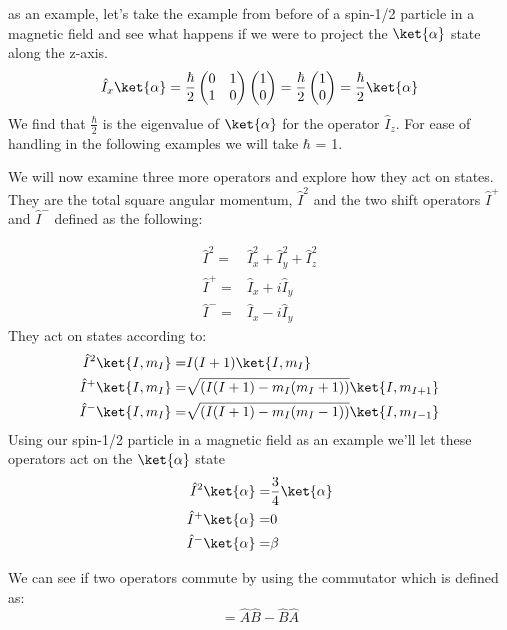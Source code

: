 as an example, let's take the example from before of a spin-1/2 particle in a magnetic field
and see what happens if we were to project the $\ket{\alpha}$ state along the z-axis.
\begin{equation}\label{eqn:operators}
  \hat{I}_x\ket{\alpha} = \frac{\hbar}{2}\begin{pmatrix}
    0 & 1\\
    1 & 0
\end{pmatrix}
\begin{pmatrix}
  1\\
  0
\end{pmatrix} = \frac{\hbar}{2}\begin{pmatrix}
  1\\
  0
\end{pmatrix} = \frac{\hbar}{2}\ket{\alpha}
\end{equation}
We find that $\frac{\hbar}{2}$ is the eigenvalue of $\ket{\alpha}$ for the operator $\hat{I}_z$. For ease of handling in the following examples we will take $\hbar$ = 1.

We will now examine three more operators and explore how they act on states. They are the total square angular momentum, $\hat{I}^2$ and the two shift operators $\hat{I}^+$ and $\hat{I}^-$ defined as the following:

\begin{align}
  \hat{I}^2 =& \hat{I}_x^2 + \hat{I}_y^2 + \hat{I}_z^2\\
  \hat{I}^+ =& \hat{I}_x + i\hat{I}_y\\
  \hat{I}^- =& \hat{I}_x - i\hat{I}_y
\end{align}
They act on states according to:
\begin{align}
  \hat{I}^2\ket{I,m_I} =& I(I+1)\ket{I, m_I}\\
  \hat{I}^+\ket{I,m_I} =& \sqrt{(I(I+1)-m_I(m_I+1))}\ket{I,m_{I+1}}\\
  \hat{I}^-\ket{I,m_I} =& \sqrt{(I(I+1)-m_I(m_I-1))}\ket{I,m_{I-1}}
\end{align}
Using our spin-1/2 particle in a magnetic field as an example we'll let these operators act on the $\ket{\alpha}$ state
\begin{align}
  \hat{I}^2\ket{\alpha} =& \frac{3}{4}\ket{\alpha}\\
  \hat{I}^+\ket{\alpha} =& 0\\
  \hat{I}^-\ket{\alpha} =& {\beta}
\end{align}

We can see if two operators commute by using the commutator which is defined as:
\begin{equation}
  [\hat{A},\hat{B}] = \hat{A}\hat{B} - \hat{B}\hat{A}
\end{equation}

